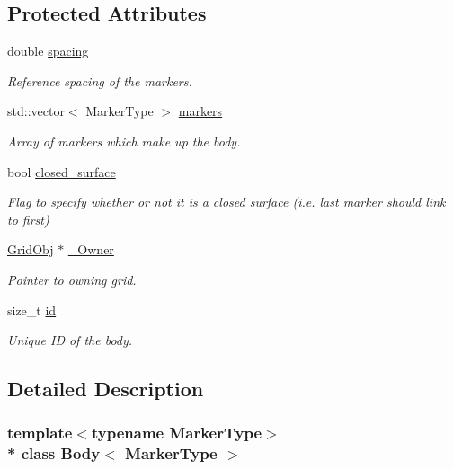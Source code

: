 \subsection*{Protected Attributes}
\begin{DoxyCompactItemize}
\item 
double \hyperlink{class_body_a1d4ac2e6fdbc946d5eab0973fd78770b}{spacing}
\begin{DoxyCompactList}\small\item\em Reference spacing of the markers. \end{DoxyCompactList}\item 
std\+::vector$<$ Marker\+Type $>$ \hyperlink{class_body_a4e0ac821f2331ec67793a44e36c855e3}{markers}
\begin{DoxyCompactList}\small\item\em Array of markers which make up the body. \end{DoxyCompactList}\item 
bool \hyperlink{class_body_a2701bdb00789d26ed72d6138d2e21bcb}{closed\+\_\+surface}
\begin{DoxyCompactList}\small\item\em Flag to specify whether or not it is a closed surface (i.\+e. last marker should link to first) \end{DoxyCompactList}\item 
\hyperlink{class_grid_obj}{Grid\+Obj} $\ast$ \hyperlink{class_body_a5197f31e50222c32adefb795a93d7156}{\+\_\+\+Owner}
\begin{DoxyCompactList}\small\item\em Pointer to owning grid. \end{DoxyCompactList}\item 
size\+\_\+t \hyperlink{class_body_a9d5166d7419f303190b6c6543e67e815}{id}
\begin{DoxyCompactList}\small\item\em Unique ID of the body. \end{DoxyCompactList}\end{DoxyCompactItemize}


\subsection{Detailed Description}
\subsubsection*{template$<$typename Marker\+Type$>$\\*
class Body$<$ Marker\+Type $>$}

